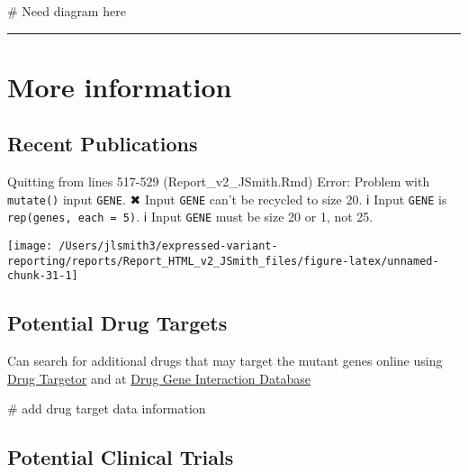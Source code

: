 \documentclass[
]{article}
\newenvironment{Shaded}{\begin{snugshade}}{\end{snugshade}}
\newcommand{\CommentTok}[1]{\textcolor[rgb]{0.48,0.49,0.49}{#1}}
\begin{document}
\begin{Shaded}
\begin{Highlighting}[]
\CommentTok{\# Need diagram here}
\end{Highlighting}
\end{Shaded}

\begin{center}\rule{0.5\linewidth}{0.5pt}\end{center}

\hypertarget{more-information}{%
\section{More information}\label{more-information}}

\hypertarget{recent-publications}{%
\subsection{Recent Publications}\label{recent-publications}}

Quitting from lines 517-529 (Report\_v2\_JSmith.Rmd) Error: Problem with
\texttt{mutate()} input \texttt{GENE}. ✖ Input \texttt{GENE} can't be
recycled to size 20. ℹ Input \texttt{GENE} is
\texttt{rep(genes,\ each\ =\ 5)}. ℹ Input \texttt{GENE} must be size 20
or 1, not 25.

\begin{center}\texttt{[image: /Users/jlsmith3/expressed-variant-reporting/reports/Report\_HTML\_v2\_JSmith\_files/figure-latex/unnamed-chunk-31-1]} \end{center}

\hypertarget{potential-drug-targets}{%
\subsection{Potential Drug Targets}\label{potential-drug-targets}}

Can search for additional drugs that may target the mutant genes online
using \href{http://drugtargetor.com/}{Drug Targetor} and at
\href{https://www.dgidb.org/}{Drug Gene Interaction Database}

\begin{Shaded}
\begin{Highlighting}[]
\CommentTok{\# add drug target data information}
\end{Highlighting}
\end{Shaded}

\hypertarget{potential-clinical-trials}{%
\subsection{Potential Clinical Trials}\label{potential-clinical-trials}}
\end{document}
